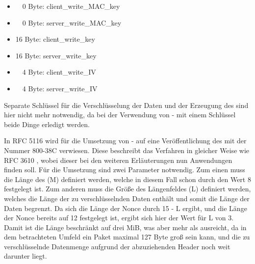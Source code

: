\begin{itemize}
  \item ~~0 Byte: client\_write\_MAC\_key
  \item ~~0 Byte: server\_write\_MAC\_key
  \item 16 Byte: client\_write\_key
  \item 16 Byte: server\_write\_key
  \item ~~4 Byte: client\_write\_IV
  \item ~~4 Byte: server\_write\_IV
\end{itemize}

Separate Schlüssel für die Verschlüsselung der Daten und der Erzeugung des  sind hier nicht mehr notwendig, da bei der Verwendung
von - mit einem Schlüssel beide Dinge erledigt werden.

In RFC 5116 \cite{rfc5116} wird für die Umsetzung von - auf eine Veröffentlichung des  mit der Nummer 800-38C \cite{nsp3610} verwiesen.
Diese beschreibt das Verfahren in gleicher Weise wie RFC 3610 \cite{rfc3610}, wobei dieser bei den weiteren Erläuterungen nun Anwendungen finden soll.
Für die Umsetzung sind zwei Parameter notwendig. Zum einen muss die Länge des  (M) definiert werden, welche in diesem Fall schon durch den Wert 8 festgelegt
ist. Zum anderen muss die Größe des Längenfeldes (L) definiert werden, welches die Länge der zu verschlüsselnden Daten enthält und somit die Länge der Daten begrenzt.
Da sich die Länge der Nonce durch 15 - L ergibt, und die Länge der Nonce bereits auf 12 festgelegt ist, ergibt sich hier der Wert für L von 3. 
Damit ist die Länge beschränkt auf drei MiB, was aber mehr als ausreicht, da in dem betrachteten Umfeld ein Paket maximal 127 Byte groß sein kann, und die zu
verschlüsselnde Datenmenge aufgrund der abzuziehenden Header noch weit darunter liegt.

